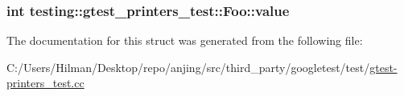 \subsubsection[{value}]{\setlength{\rightskip}{0pt plus 5cm}int testing\+::gtest\+\_\+printers\+\_\+test\+::\+Foo\+::value}\label{structtesting_1_1gtest__printers__test_1_1_foo_a8171a69191d34071ea4448d2dda501ec}


The documentation for this struct was generated from the following file\+:\begin{DoxyCompactItemize}
\item 
C\+:/\+Users/\+Hilman/\+Desktop/repo/anjing/src/third\+\_\+party/googletest/test/\hyperlink{gtest-printers__test_8cc}{gtest-\/printers\+\_\+test.\+cc}\end{DoxyCompactItemize}

